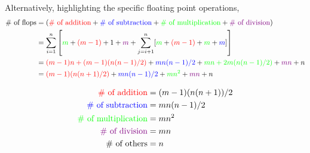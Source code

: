 \documentclass[10pt]{article}
\begin{document}
\begin{solution}[Solution]
Alternatively, highlighting the specific floating point operations,
\begin{align*}
    \text{\# of flops} &= (\text{\color{red}\# of addition} + \text{\color{blue}\# of subtraction} + \text{\color{green}\# of multiplication} + \text{\color{violet}\# of division})  \\
    &= \sum_{i=1}^{n}\left[ {\color{green}m}+{\color{red}(m-1)}+1+{\color{violet} m}+\sum_{j=i+1}^{n}[{\color{green}m}+{\color{red}(m-1)}+{\color{green} m}+{\color{blue}m}] \right] \\
    &= {\color{red} (m-1)n+(m-1)(n(n-1)/2)} + {\color{blue} mn(n-1)/2}+ {\color{green} mn+2m(n(n-1)/2)} + {\color{violet} mn} + n \\
    &= {\color{red} (m-1)(n(n+1)/2)} + {\color{blue}mn(n-1)/2}  +{\color{green} mn^2} + {\color{violet} mn} + n 
\end{align*}

\begin{align*}
    {\color{red} \text{\# of addition}} &= (m-1)(n(n+1))/2 \\ 
    {\color{blue} \text{\# of subtraction}} &= mn(n-1)/2 \\
    {\color{green} \text{\# of multiplication}}  &=mn^2 \\
    {\color{violet} \text{\# of division}} &= mn \\
    \text{\# of others} &= n
\end{align*}
    

\end{solution}
\end{document}
